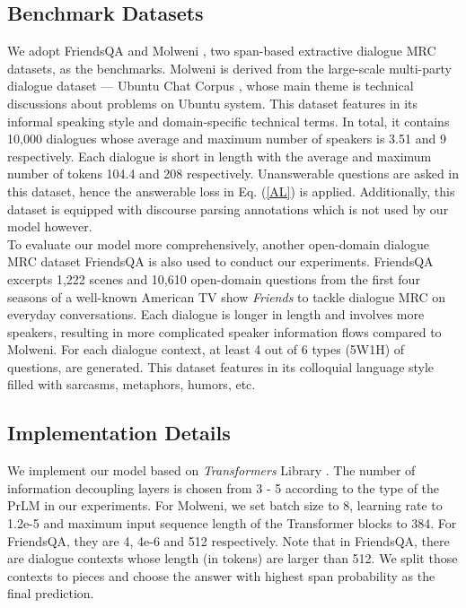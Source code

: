 \documentclass[11pt]{article}
\begin{document}
	\subsection{Benchmark Datasets}
	We adopt FriendsQA \citep{yang2019friendsqa} and Molweni \cite{li2020molweni}, two span-based extractive dialogue MRC datasets, as the benchmarks.
	Molweni is derived from the large-scale multi-party dialogue dataset --- Ubuntu Chat Corpus \citep{lowe2015ubuntu}, whose main theme is technical discussions about problems on Ubuntu system. This dataset features in its informal speaking style and domain-specific technical terms. In total, it contains 10,000 dialogues whose average and maximum number of speakers is 3.51 and 9 respectively. Each dialogue is short in length with the average and maximum number of tokens 104.4 and 208 respectively. Unanswerable questions are asked in this dataset, hence the answerable loss in Eq. (\ref{AL}) is applied. Additionally, this dataset is equipped with discourse parsing annotations which is not used by our model however.\\
	To evaluate our model more comprehensively, another open-domain dialogue MRC dataset FriendsQA is also used to conduct our experiments. FriendsQA excerpts 1,222 scenes and 10,610 open-domain questions from the first four seasons of a well-known American TV show \emph{Friends} to tackle dialogue MRC on everyday conversations. 
	Each dialogue is longer in length and involves more speakers, resulting in more complicated speaker information flows compared to Molweni. 
	For each dialogue context, at least 4 out of 6 types (5W1H) of questions, are generated. This dataset features in its colloquial language style filled with sarcasms, metaphors, humors, etc.
	
	\subsection{Implementation Details}
	We implement our model based on \emph{Transformers} Library \citep{wolf2020transformers}. The number of information decoupling layers  is chosen from 3 - 5 according to the type of the PrLM in our experiments. For Molweni, we set batch size to 8, learning rate to 1.2e-5 and maximum input sequence length of the Transformer blocks to 384. For FriendsQA, they are 4, 4e-6 and 512 respectively. Note that in FriendsQA, there are dialogue contexts whose length (in tokens) are larger than 512. We split those contexts to pieces and choose the answer with highest span probability  as the final prediction.
	
\end{document}
